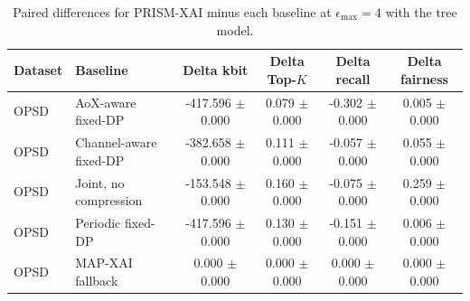 \begin{table}[t]
\caption{Paired differences for PRISM-XAI minus each baseline at $\epsilon_{\max}=4$ with the tree model.}
\label{tab:paired-differences}
\centering
\scriptsize
\setlength{\tabcolsep}{3pt}
\begin{tabular}{llcccc}
\toprule
Dataset & Baseline & Delta kbit & Delta Top-$K$ & Delta recall & Delta fairness \\
\midrule
OPSD & AoX-aware fixed-DP & -417.596 $\pm$ 0.000 & 0.079 $\pm$ 0.000 & -0.302 $\pm$ 0.000 & 0.005 $\pm$ 0.000 \\
OPSD & Channel-aware fixed-DP & -382.658 $\pm$ 0.000 & 0.111 $\pm$ 0.000 & -0.057 $\pm$ 0.000 & 0.055 $\pm$ 0.000 \\
OPSD & Joint, no compression & -153.548 $\pm$ 0.000 & 0.160 $\pm$ 0.000 & -0.075 $\pm$ 0.000 & 0.259 $\pm$ 0.000 \\
OPSD & Periodic fixed-DP & -417.596 $\pm$ 0.000 & 0.130 $\pm$ 0.000 & -0.151 $\pm$ 0.000 & 0.006 $\pm$ 0.000 \\
OPSD & MAP-XAI fallback & 0.000 $\pm$ 0.000 & 0.000 $\pm$ 0.000 & 0.000 $\pm$ 0.000 & 0.000 $\pm$ 0.000 \\
\bottomrule
\end{tabular}
\end{table}
